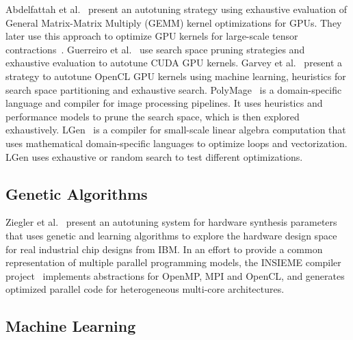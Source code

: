Abdelfattah et al.~\cite{abdelfattah2016performance} present an autotuning
strategy using exhaustive evaluation of General Matrix-Matrix Multiply (GEMM)
kernel optimizations for GPUs. They later use this approach to optimize GPU
kernels for large-scale tensor contractions~\cite{abdelfattah2016high}.
Guerreiro et al.~\cite{guerreiro2015multi} use search space pruning strategies
and exhaustive evaluation to autotune CUDA GPU kernels.  Garvey et
al.~\cite{garvey2015automatic} present a strategy to autotune OpenCL GPU
kernels using machine learning, heuristics for search space partitioning and
exhaustive search.  PolyMage~\cite{mullapudi2015polymage} is a domain-specific
language and compiler for image processing pipelines. It uses heuristics and
performance models to prune the search space, which is then explored
exhaustively.  LGen~\cite{spampinato2014basic} is a compiler for small-scale
linear algebra computation that uses mathematical domain-specific languages to
optimize loops and vectorization. LGen uses exhaustive or random search to test
different optimizations.

\subsection{Genetic Algorithms}

Ziegler et al.~\cite{ziegler2016synthesis,ziegler2016scalable} present an
autotuning system for hardware synthesis parameters that uses genetic and
learning algorithms to explore the hardware design space for real industrial
chip designs from IBM.  In an effort to provide a common representation of
multiple parallel programming models, the INSIEME compiler
project~\cite{jordan2012multi} implements abstractions for OpenMP, MPI and
OpenCL, and generates optimized parallel code for heterogeneous multi-core
architectures.

\subsection{Machine Learning}

